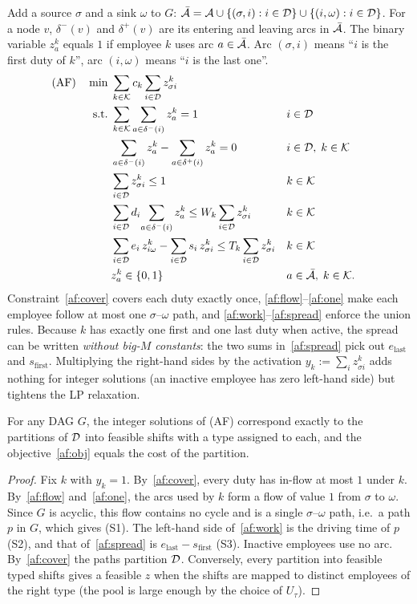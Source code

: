 Add a source $\sigma$ and a sink $\omega$ to $G$:
$\bar{\mathcal{A}}=\mathcal{A}\cup\{(\sigma,i):i\in\mathcal{D}\}\cup\{(i,\omega):i\in\mathcal{D}\}$. For a node
$v$, $\delta^-(v)$ and $\delta^+(v)$ are its entering and leaving arcs in
$\bar{\mathcal{A}}$. The binary variable $z^k_a$ equals $1$ if employee $k$ uses
arc $a\in\bar{\mathcal{A}}$. Arc $(\sigma,i)$ means ``$i$ is the first duty of $k$'',
arc $(i,\omega)$ means ``$i$ is the last one''.
\begin{align}
\text{(AF)}\quad
\min\;& \sum_{k\in\mathcal{K}} c_k \sum_{i\in\mathcal{D}} z^k_{\sigma i} \label{af:obj}\\
\text{s.t.}\;
& \sum_{k\in\mathcal{K}}\sum_{a\in\delta^-(i)} z^k_a = 1
      && i\in\mathcal{D} \label{af:cover}\\
& \sum_{a\in\delta^-(i)} z^k_a-\sum_{a\in\delta^+(i)} z^k_a = 0
      && i\in\mathcal{D},\;k\in\mathcal{K} \label{af:flow}\\
& \sum_{i\in\mathcal{D}} z^k_{\sigma i}\le 1
      && k\in\mathcal{K} \label{af:one}\\
& \sum_{i\in\mathcal{D}} d_i\!\sum_{a\in\delta^-(i)} z^k_a \le
      W_k\sum_{i\in\mathcal{D}} z^k_{\sigma i}
      && k\in\mathcal{K} \label{af:work}\\
& \sum_{i\in\mathcal{D}} e_i\, z^k_{i\omega}-\sum_{i\in\mathcal{D}} s_i\, z^k_{\sigma i}
      \le T_k\sum_{i\in\mathcal{D}} z^k_{\sigma i}
      && k\in\mathcal{K} \label{af:spread}\\
& z^k_a\in\{0,1\} && a\in\bar{\mathcal{A}},\;k\in\mathcal{K}. \nonumber
\end{align}
Constraint~\eqref{af:cover} covers each duty exactly once,
\eqref{af:flow}--\eqref{af:one} make each employee follow at most one
$\sigma$--$\omega$ path, and \eqref{af:work}--\eqref{af:spread} enforce the
union rules. Because $k$ has exactly one first and one last duty when active,
the spread can be written \emph{without big-$M$ constants}: the two sums
in~\eqref{af:spread} pick out $e_{\text{last}}$ and $s_{\text{first}}$.
Multiplying the right-hand sides by the activation
$y_k:=\sum_i z^k_{\sigma i}$ adds nothing for integer solutions (an inactive
employee has zero left-hand side) but tightens the LP relaxation.

\begin{proposition}\label{prop:af}
For any DAG $G$, the integer solutions of (AF) correspond exactly to the
partitions of $\mathcal{D}$ into feasible shifts with a type assigned to each, and the
objective~\eqref{af:obj} equals the cost of the partition.
\end{proposition}
\begin{proof}
Fix $k$ with $y_k=1$. By~\eqref{af:cover}, every duty has in-flow at most $1$
under $k$. By~\eqref{af:flow} and~\eqref{af:one}, the arcs used by $k$ form a
flow of value $1$ from $\sigma$ to $\omega$. Since $G$ is acyclic, this flow
contains no cycle and is a single $\sigma$--$\omega$ path, i.e.\ a path
$p$ in $G$, which gives (S1). The left-hand side of~\eqref{af:work} is the
driving time of $p$ (S2), and that of~\eqref{af:spread} is
$e_{\text{last}}-s_{\text{first}}$ (S3). Inactive employees use no arc.
By~\eqref{af:cover} the paths partition $\mathcal{D}$. Conversely, every partition
into feasible typed shifts gives a feasible $z$ when the shifts are mapped
to distinct employees of the right type (the pool is large enough by the
choice of $U_\tau$).
\end{proof}

